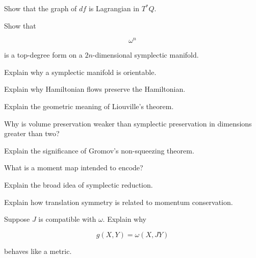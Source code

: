 \begin{exercise}[3]
Show that the graph of \(df\) is Lagrangian in \(T^*Q\).
\end{exercise}

\begin{exercise}[3]
Show that

\[
\omega^n
\]

is a top-degree form on a \(2n\)-dimensional symplectic manifold.
\end{exercise}

\begin{exercise}[3]
Explain why a symplectic manifold is orientable.
\end{exercise}

\begin{exercise}[3]
Explain why Hamiltonian flows preserve the Hamiltonian.
\end{exercise}

\begin{exercise}[3]
Explain the geometric meaning of Liouville's theorem.
\end{exercise}

\begin{exercise}[3]
Why is volume preservation weaker than symplectic preservation in dimensions
greater than two?
\end{exercise}

\begin{exercise}[3]
Explain the significance of Gromov's non-squeezing theorem.
\end{exercise}

\begin{exercise}[3]
What is a moment map intended to encode?
\end{exercise}

\begin{exercise}[3]
Explain the broad idea of symplectic reduction.
\end{exercise}

\begin{exercise}[3]
Explain how translation symmetry is related to momentum conservation.
\end{exercise}

\begin{exercise}[3]
Suppose \(J\) is compatible with \(\omega\). Explain why

\[
g(X,Y)=\omega(X,JY)
\]

behaves like a metric.
\end{exercise}


